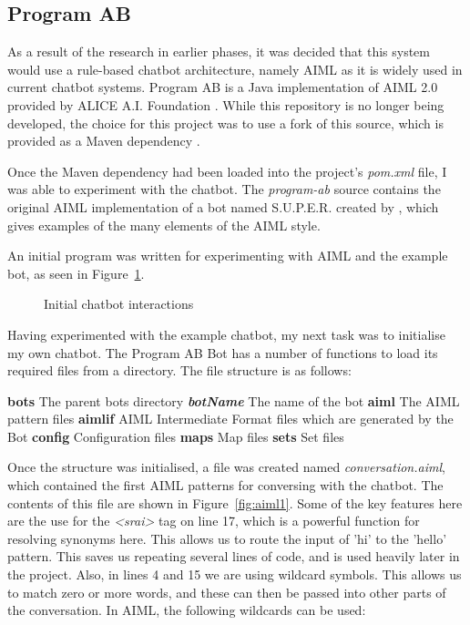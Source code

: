 \subsection{Program AB}
As a result of the research in earlier phases, it was decided that this system would use a rule-based chatbot architecture, namely AIML as it is widely used in current chatbot systems. Program AB is a Java implementation of AIML 2.0 provided by ALICE A.I. Foundation \cite{programab_2013}. While this repository is no longer being developed, the choice for this project was to use a fork of this source, which is provided as a Maven dependency \cite{lumenrobot2016}.

Once the Maven dependency had been loaded into the project's {\it{pom.xml}} file, I was able to experiment with the chatbot. The {\it{program-ab}} source contains the original AIML implementation of a bot named S.U.P.E.R. created by \citeauthor{wallace2009anatomy}, which gives examples of the many elements of the AIML style.

An initial program was written for experimenting with AIML and the example bot, as seen in Figure~\ref{fig:super}. 

\begin{figure}[ht]
	\centering
	\qquad
	\caption{Initial chatbot interactions}
	\label{fig:super}
\end{figure}

\newpage
Having experimented with the example chatbot, my next task was to initialise my own chatbot. The Program AB Bot has a number of functions to load its required files from a directory. The file structure is as follows:

\begin{outline}
	\1 \textbf{bots} The parent bots directory
		\2 \textbf{\emph{botName}} The name of the bot
			\3 \textbf{aiml} The AIML pattern files 
			\3 \textbf{aimlif} AIML Intermediate Format files which are generated by the Bot
			\3 \textbf{config} Configuration files
			\3 \textbf{maps} Map files
			\3 \textbf{sets} Set files
\end{outline}
	
Once the structure was initialised, a file was created named {\it{conversation.aiml}}, which contained the first AIML patterns for conversing with the chatbot. The contents of this file are shown in Figure~\ref{fig:aiml1}. Some of the key features here are the use for the {\it{<srai>}} tag on line 17, which is a powerful function for resolving synonyms here. This allows us to route the input of 'hi' to the 'hello' pattern. This saves us repeating several lines of code, and is used heavily later in the project. Also, in lines 4 and 15 we are using wildcard symbols. This allows us to match zero or more words, and these can then be passed into other parts of the conversation. In AIML, the following wildcards can be used:

